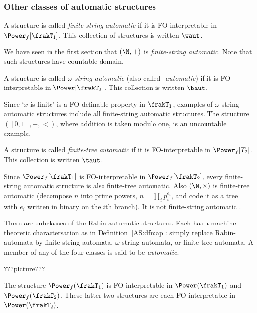 \subsubsection{Other classes of automatic structures}

\begin{definition}
A structure is called {\em finite-string automatic} if it is FO-interpretable in $\Power_f[\frakT_1]$. This collection of structures is written $\waut$.
\end{definition}

We have seen in the first section that $(\N,+)$ is {\em finite-string automatic}. 
Note that such structures have countable domain.

\begin{definition}
A structure is called {\em $\omega$-string automatic} (also called {\em \buchi-automatic}) if it is FO-interpretable in $\Power[\frakT_1]$. This collection is written $\baut$.
\end{definition}

Since `$x$ is finite' is a FO-definable property in $\frakT_1$, examples of $\omega$-string automatic structures 
include all finite-string automatic structures.
The structure $([0,1],+,<)$, where addition is taken modulo one, is an uncountable example.

\begin{definition}
A structure is called {\em finite-tree automatic} if it is FO-interpretable 
in $\Power_f[T_2]$.  This collection is written $\taut$.
\end{definition}

Since $\Power_f[\frakT_1]$ is FO-interpretable in $\Power_f[\frakT_2]$, every
finite-string automatic structure is also finite-tree automatic.  Also
$(\N,\times)$ is finite-tree automatic (decompose $n$ into prime powers,
$n=\prod_{i} p_i^{e_i}$, and code it as a tree with $e_i$ written in binary on
the $i$th branch). It is not finite-string automatic \cite{}.

These are subclasses of the Rabin-automatic structures. Each has a machine theoretic charactersation as in Definition~\ref{AS:dfn:ap}: simply replace Rabin-automata by
finite-string automata, $\omega$-string automata, or finite-tree automata.
A member of any of the four classes is said to be {\em automatic}.

???picture???

\begin{lemma} \label{AS:lem:relations}
The structure $\Power_f(\frakT_1)$ is FO-interpretable in $\Power(\frakT_1)$ and $\Power_f(\frakT_2)$. These latter two structures 
are each FO-interpretable in $\Power(\frakT_2)$.
\end{lemma}

